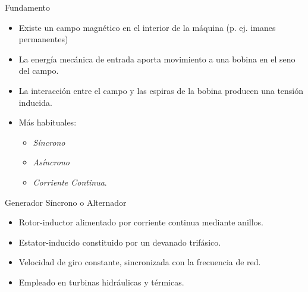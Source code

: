 \documentclass[xcolor={usenames,svgnames,dvipsnames}]{beamer}
\begin{document}
\begin{frame}[label={sec:orgc6eb018}]{Fundamento}
\begin{itemize}
\item Existe un \alert{campo magnético en el interior de la máquina} (p. ej. imanes permanentes)
\item La \alert{energía mecánica de entrada} aporta \alert{movimiento a una bobina} en el seno del campo.
\item La \alert{interacción} entre el campo y las espiras de la bobina producen una \alert{tensión inducida}.
\item Más habituales:
\begin{itemize}
\item \emph{Síncrono}
\item \emph{Asíncrono}
\item \emph{Corriente Continua}.
\end{itemize}
\end{itemize}
\end{frame}


\begin{frame}[label={sec:org162fe23}]{Generador Síncrono o Alternador}
\begin{itemize}
\item \alert{Rotor-inductor} alimentado por \alert{corriente continua} mediante anillos.

\item \alert{Estator-inducido} constituido por un \alert{devanado trifásico}.

\item Velocidad de giro constante, sincronizada con la frecuencia de red.

\item Empleado en turbinas hidráulicas y térmicas.
\end{itemize}
\end{frame}
\end{document}
